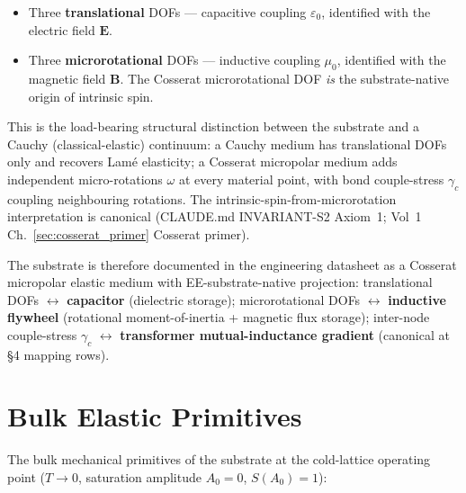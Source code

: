 \begin{itemize}
    \item Three \textbf{translational} DOFs --- capacitive coupling $\varepsilon_0$, identified with the electric field $\mathbf{E}$.
    \item Three \textbf{microrotational} DOFs --- inductive coupling $\mu_0$, identified with the magnetic field $\mathbf{B}$. The Cosserat microrotational DOF \emph{is} the substrate-native origin of intrinsic spin.
\end{itemize}

This is the load-bearing structural distinction between the substrate and a Cauchy (classical-elastic) continuum: a Cauchy medium has translational DOFs only and recovers Lam\'e elasticity; a Cosserat micropolar medium adds independent micro-rotations $\omega$ at every material point, with bond couple-stress $\gamma_c$ coupling neighbouring rotations. The intrinsic-spin-from-microrotation interpretation is canonical (CLAUDE.md INVARIANT-S2 Axiom~1; Vol~1 Ch.~\ref{sec:cosserat_primer} Cosserat primer).

The substrate is therefore documented in the engineering datasheet as a Cosserat micropolar elastic medium with EE-substrate-native projection: translational DOFs $\leftrightarrow$ \textbf{capacitor} (dielectric storage); microrotational DOFs $\leftrightarrow$ \textbf{inductive flywheel} (rotational moment-of-inertia + magnetic flux storage); inter-node couple-stress $\gamma_c$ $\leftrightarrow$ \textbf{transformer mutual-inductance gradient} (canonical at  \S 4 mapping rows).

\section{Bulk Elastic Primitives}
\label{sec:vol9_mech_bulk_table}

The bulk mechanical primitives of the substrate at the cold-lattice operating point ($T \to 0$, saturation amplitude $A_0 = 0$, $S(A_0) = 1$):

